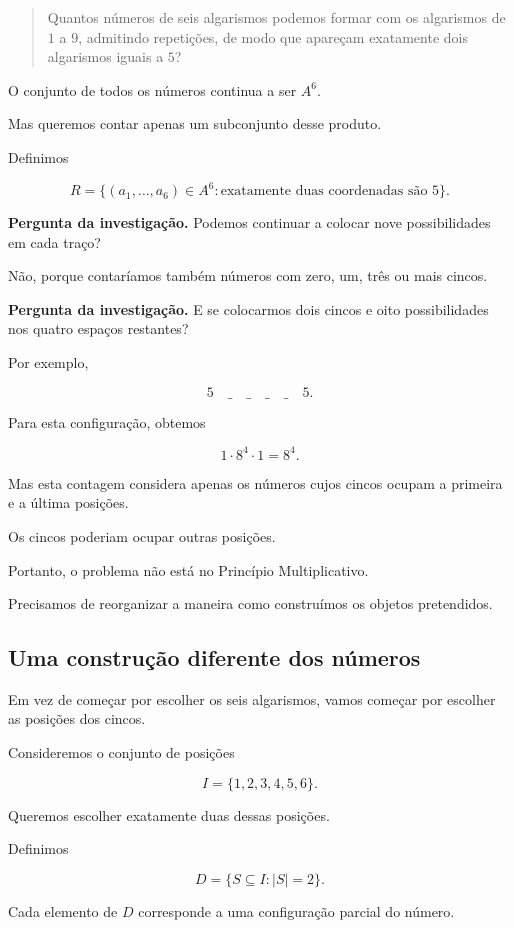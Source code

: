 \documentclass[11pt,a4paper,oneside]{book}
\newcommand{\Pergunta}[1]{\begin{perguntabox}\textbf{Pergunta da investigação.} #1\end{perguntabox}}
\newcommand{\card}[1]{\lvert #1\rvert}
\begin{document}
\begin{quote}
Quantos números de seis algarismos
podemos formar com os algarismos
de $1$ a $9$, admitindo repetições,
de modo que apareçam exatamente
dois algarismos iguais a $5$?
\end{quote}

O conjunto de todos os números
continua a ser $A^6$.

Mas queremos contar apenas
um subconjunto desse produto.

Definimos

\[
R=\{(a_1,\ldots,a_6)\in A^6:
\text{exatamente duas coordenadas são }5\}.
\]

\Pergunta{Podemos continuar a colocar
nove possibilidades em cada traço?}

Não, porque contaríamos também números
com zero, um, três ou mais cincos.

\Pergunta{E se colocarmos dois cincos
e oito possibilidades nos quatro
espaços restantes?}

Por exemplo,

\[
5\quad\_\quad\_\quad\_\quad\_\quad5.
\]

Para esta configuração,
obtemos

\[
1\cdot8^4\cdot1=8^4.
\]

Mas esta contagem considera apenas
os números cujos cincos ocupam
a primeira e a última posições.

Os cincos poderiam ocupar
outras posições.

Portanto, o problema não está
no Princípio Multiplicativo.

Precisamos de reorganizar
a maneira como construímos
os objetos pretendidos.

\subsection*{Uma construção diferente dos números}

Em vez de começar por escolher
os seis algarismos, vamos começar
por escolher as posições dos cincos.

Consideremos o conjunto de posições

\[
I=\{1,2,3,4,5,6\}.
\]

Queremos escolher exatamente
duas dessas posições.

Definimos

\[
D=\{S\subseteq I:\card S=2\}.
\]

Cada elemento de $D$ corresponde
a uma configuração parcial
do número.
\end{document}
